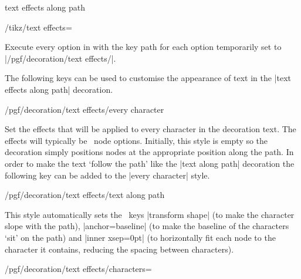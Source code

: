 \begin{decoration}{text effects along path}
\begin{key}{/tikz/text effects=}

  Execute every option in  with the
  key path for each option temporarily set to  |/pgf/decoration/text effects/|.
  
\end{key}


  The following keys can be used to customise the
  appearance of text in the |text effects along path|
  decoration.
	 



\begin{stylekey}{/pgf/decoration/text effects/every character}

	Set the effects that will be applied to 
	every character in the decoration text. The effects
	will typically be \tikzname\ node options.
	Initially, this style is empty so the decoration simply positions
	nodes at the appropriate position along the path. In order to
	make the text `follow the path' like the |text along path| decoration
	the following key can be added to the |every character| style. 
	
\end{stylekey}


\begin{stylekey}{/pgf/decoration/text effects/text along path}

	This style automatically sets the \tikzname\ keys 
	|transform shape| (to make the character slope with the path),
	|anchor=baseline| (to make the baseline of the characters `sit' on 
	the path) and |inner xsep=0pt| (to horizontally fit each node to the character
	it contains, reducing the spacing between characters).
	
\begin{codeexample}[]
\end{codeexample}
\end{stylekey}


\begin{key}{/pgf/decoration/text effects/characters=}


\end{key}
\end{decoration}
